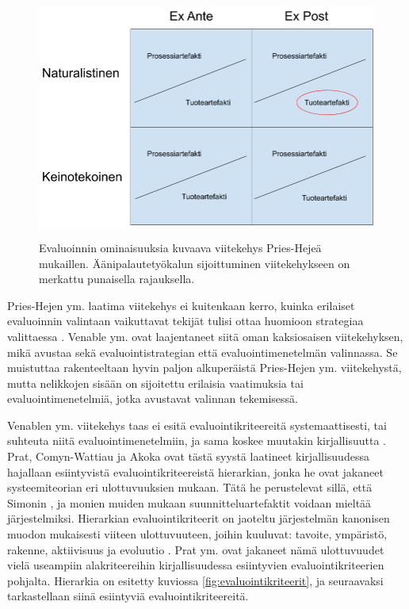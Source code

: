 \documentclass[utf8]{gradu3}
\begin{document}
\begin{figure}[H]\centering
  \includegraphics[height=8cm,keepaspectratio]{heje}
  \caption{Evaluoinnin ominaisuuksia kuvaava viitekehys Pries-Hejeä \parencite*{pries} mukaillen. Äänipalautetyökalun sijoittuminen viitekehykseen on merkattu punaisella rajauksella.}
  \label{fig:heje}
\end{figure}

Pries-Hejen ym. \parencite*{pries} laatima viitekehys ei kuitenkaan kerro, kuinka erilaiset evaluoinnin valintaan vaikuttavat tekijät tulisi ottaa huomioon strategiaa valittaessa \parencite{comprehensive}. Venable ym. \parencite*{comprehensive} ovat laajentaneet siitä oman kaksiosaisen viitekehyksen, mikä avustaa sekä evaluointistrategian että evaluointimenetelmän valinnassa. Se muistuttaa rakenteeltaan hyvin paljon alkuperäistä Pries-Hejen ym. \parencite*{pries} viitekehystä, mutta nelikkojen sisään on sijoitettu erilaisia vaatimuksia tai evaluointimenetelmiä, jotka avustavat valinnan tekemisessä. 

Venablen ym. \parencite{comprehensive} viitekehys taas ei esitä evaluointikriteereitä systemaattisesti, tai suhteuta niitä evaluointimenetelmiin, ja sama koskee muutakin kirjallisuutta \parencite{evaluation}. Prat, Comyn-Wattiau ja Akoka \parencite*{evaluation} ovat tästä syystä laatineet kirjallisuudessa hajallaan esiintyvistä evaluointikriteereistä hierarkian, jonka he ovat jakaneet systeemiteorian eri ulottuvuuksien mukaan. Tätä he perustelevat sillä, että Simonin \parencite*{simon1996}, ja monien muiden mukaan suunnitteluartefaktit voidaan mieltää järjestelmiksi. Hierarkian evaluointikriteerit on jaoteltu järjestelmän kanonisen muodon mukaisesti viiteen ulottuvuuteen, joihin kuuluvat: tavoite, ympäristö, rakenne, aktiivisuus ja evoluutio \parencite{modeling, systemic}. Prat ym. \parencite*{evaluation} ovat jakaneet nämä ulottuvuudet vielä useampiin alakriteereihin kirjallisuudessa esiintyvien evaluointikriteerien pohjalta. Hierarkia on esitetty kuviossa \ref{fig:evaluointikriteerit}, ja seuraavaksi tarkastellaan siinä esiintyviä evaluointikriteereitä.
\end{document}

